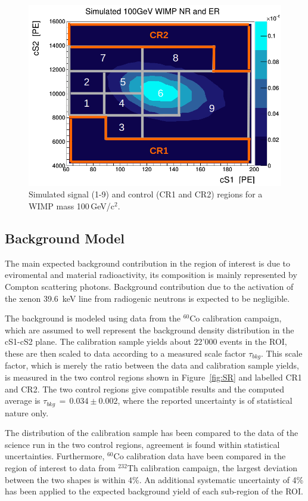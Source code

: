 \begin{figure}[t!]
  \includegraphics[width=\linewidth]{images/wimp_in_sr.png}
  \caption{Simulated signal (1-9) and control (CR1 and CR2) regions for a WIMP mass 100\,GeV/c$^2$.}
  \label{fig:SR2}
\end{figure}


\subsection {Background Model}

The main expected background contribution in the region of interest is due to eviromental and material radioactivity, its composition is mainly
represented by Compton scattering photons. Background contribution due to the activation of the xenon 39.6~keV line from radiogenic neutrons is expected to be negligible.

The background is modeled using data from the $^{60}$Co calibration campaign, which are assumed to well represent the background density distribution 
in the cS1-cS2 plane. 
The calibration sample yields  about 22'000 events in the ROI, these are then scaled to data according to a measured scale factor $\tau_{bkg}$.
This scale factor, which is merely the ratio between the data and calibration sample yields, is measured in the two control regions shown in Figure~\ref{fig:SR} and labelled CR1 and CR2. The two control 
regions give compatible results and the computed average is $\tau_{bkg} \, =  \, 0.034 \pm 0.002 $, where the reported uncertainty 
is of statistical nature only.

The distribution of the calibration sample has been compared to the data of the science run in the two control regions,
agreement is found within statistical uncertainties. Furthermore, $^{60}$Co calibration data have been compared in the region of interest to  
data from $^{232}$Th calibration campaign, the largest deviation between the two shapes is within 4\%. An additional systematic
uncertainty of 4\% has been applied to the expected background yield of each sub-region of the ROI.




